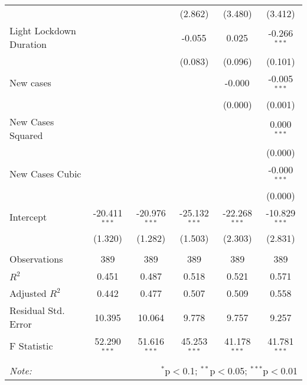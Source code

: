 \begin{tabular}{@{\extracolsep{5pt}}lccccc}
  & & & (2.862) & (3.480) & (3.412) \\
 Light Lockdown Duration & & & -0.055$^{}$ & 0.025$^{}$ & -0.266$^{***}$ \\
  & & & (0.083) & (0.096) & (0.101) \\
 New cases & & & & -0.000$^{}$ & -0.005$^{***}$ \\
  & & & & (0.000) & (0.001) \\
 New Cases Squared & & & & & 0.000$^{***}$ \\
  & & & & & (0.000) \\
 New Cases Cubic & & & & & -0.000$^{***}$ \\
  & & & & & (0.000) \\
 Intercept & -20.411$^{***}$ & -20.976$^{***}$ & -25.132$^{***}$ & -22.268$^{***}$ & -10.829$^{***}$ \\
  & (1.320) & (1.282) & (1.503) & (2.303) & (2.831) \\
\hline \\[-1.8ex]
 Observations & 389 & 389 & 389 & 389 & 389 \\
 $R^2$ & 0.451 & 0.487 & 0.518 & 0.521 & 0.571 \\
 Adjusted $R^2$ & 0.442 & 0.477 & 0.507 & 0.509 & 0.558 \\
 Residual Std. Error & 10.395 & 10.064 & 9.778 & 9.757 & 9.257  \\
 F Statistic & 52.290$^{***}$  & 51.616$^{***}$  & 45.253$^{***}$  & 41.178$^{***}$  & 41.781$^{***}$  \\
\hline
\hline \\[-1.8ex]
\textit{Note:} & \multicolumn{5}{r}{$^{*}$p$<$0.1; $^{**}$p$<$0.05; $^{***}$p$<$0.01} \\
\end{tabular}
